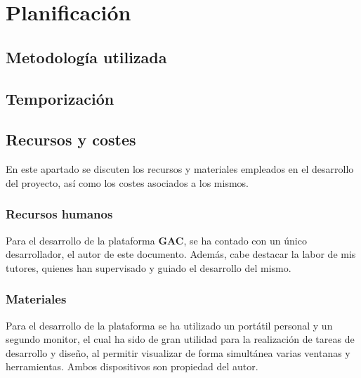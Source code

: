 \chapter{Planificación}

\newpage

\section{Metodología utilizada}


\section{Temporización}

\section{Recursos y costes}

En este apartado se discuten los recursos y materiales empleados en el desarrollo del proyecto, así como los costes asociados a los mismos.

\subsection{Recursos humanos}

Para el desarrollo de la plataforma \textbf{GAC}, se ha contado con un único desarrollador, el autor de este documento. Además, cabe destacar la labor de mis tutores, quienes han supervisado y guiado el desarrollo del mismo.

\subsection{Materiales}

Para el desarrollo de la plataforma se ha utilizado un portátil personal y un segundo monitor, el cual ha sido de gran utilidad para la realización de tareas de desarrollo y diseño, al permitir visualizar de forma simultánea varias ventanas y herramientas. Ambos dispositivos son propiedad del autor.


